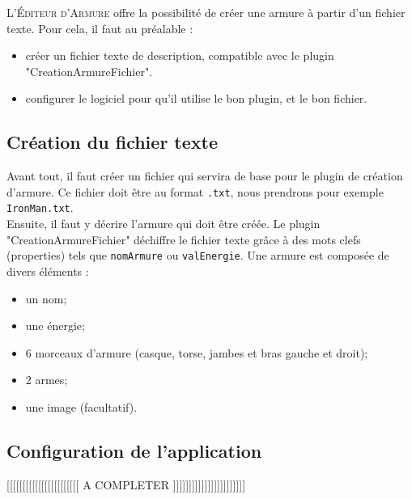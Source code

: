 
L'\textsc{\'Editeur d'Armure} offre la possibilité de créer une armure à partir d'un fichier texte. Pour cela, il faut au préalable : 
\begin{itemize}
	\item créer un fichier texte de description, compatible avec le plugin "CreationArmureFichier".
	\item configurer le logiciel pour qu'il utilise le bon plugin, et le bon fichier.
\end{itemize}


\subsection{Création du fichier texte}

Avant tout, il faut créer un fichier qui servira de base pour le plugin de création d'armure. Ce fichier doit être au format \texttt{.txt}, nous prendrons pour exemple \texttt{IronMan.txt}.\\

Ensuite, il faut y décrire l'armure qui doit être créée. Le plugin "CreationArmureFichier" déchiffre le fichier texte grâce à des mots clefs (properties) tels que \texttt{nomArmure} ou \texttt{valEnergie}. Une armure est composée de divers éléments :
\begin{itemize}
	\item un nom;
	\item une énergie;
	\item 6 morceaux d'armure (casque, torse, jambes et bras gauche et droit);
	\item 2 armes;
	\item une image (facultatif).
\end{itemize}

\subsection{Configuration de l'application}

[[[[[[[[[[[[[[[[[[[[[[[ A COMPLETER ]]]]]]]]]]]]]]]]]]]]]]]
